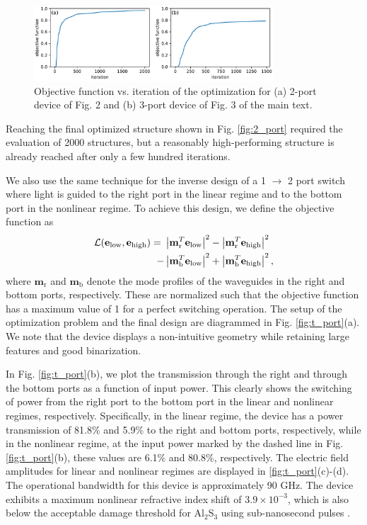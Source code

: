 \begin{figure}[h]
\centering
\includegraphics[width=0.8\textwidth]{figures/angler_objfns_11_1.pdf}
\caption{\label{fig:objfns} Objective function vs. iteration of the optimization for (a) 2-port device of Fig. 2 and (b) 3-port device of Fig. 3 of the main text.}
\end{figure}
Reaching the final optimized structure shown in Fig. \ref{fig:2_port} required the evaluation of 2000 structures, but a reasonably high-performing structure is already reached after only a few hundred iterations.  

We also use the same technique for the inverse design of a 1 $\to$ 2 port switch where light is guided to the right port in the linear regime and to the bottom port in the nonlinear regime.  To achieve this design, we define the objective function as
%
\begin{align}
    \mathcal{L}(\mathbf{e}_\textrm{low}, \mathbf{e}_\textrm{high}) =~ & \left|\mathbf{m}_\textrm{r}^T \mathbf{e}_\textrm{low}\right|^2 - \left|\mathbf{m}_\textrm{r}^T \mathbf{e}_\textrm{high}\right|^2 \\ \nonumber
    - &\left|\mathbf{m}_\textrm{b}^T \mathbf{e}_\textrm{low}\right|^2 + \left|\mathbf{m}_\textrm{b}^T \mathbf{e}_\textrm{high}\right|^2 ,
\end{align}
%
where $\mathbf{m}_\textrm{r}$ and $\mathbf{m}_\textrm{b}$ denote the mode profiles of the waveguides in the right and bottom ports, respectively. These are normalized such that the objective function has a maximum value of 1 for a perfect switching operation.  The setup of the optimization problem and the final design are diagrammed in Fig. \ref{fig:t_port}(a). We note that the device displays a non-intuitive geometry while retaining large features and good binarization.

In Fig. \ref{fig:t_port}(b), we plot the transmission through the right and through the bottom ports as a function of input power. This clearly shows the switching of power from the right port to the bottom port in the linear and nonlinear regimes, respectively.  Specifically, in the linear regime, the device has a power transmission of 81.8\% and 5.9\% to the right and bottom ports, respectively, while in the nonlinear regime, at the input power marked by the dashed line in Fig. \ref{fig:t_port}(b), these values are 6.1\% and 80.8\%, respectively. The electric field amplitudes for linear and nonlinear regimes are displayed in \ref{fig:t_port}(c)-(d). The operational bandwidth for this device is approximately 90 GHz.  The device exhibits a maximum nonlinear refractive index shift of $3.9 \times 10^{-3}$, which is also below the acceptable damage threshold for Al$_2$S$_3$ using sub-nanosecond pulses \cite{chorel2018robust}.


